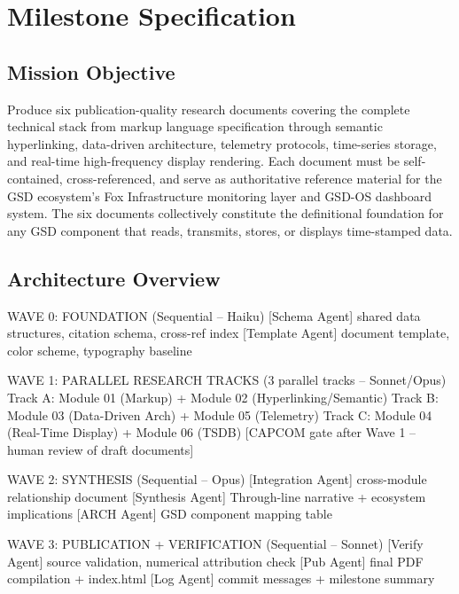 \documentclass[11pt,letterpaper]{article}
\newcommand{\stageheader}[2]{%
  \noindent\colorbox{#2}{\makebox[\textwidth][l]{%
    \textcolor{white}{\bfseries\sffamily\hspace{6pt}#1\hspace{6pt}}}}%
  \vspace{0.5em}\par%
}
\begin{document}
\newpage
\stageheader{STAGE 3 --- MISSION PACKAGE}{tertiary}

\section{Milestone Specification}

\subsection{Mission Objective}

Produce six publication-quality research documents covering the complete technical stack from markup language specification through semantic hyperlinking, data-driven architecture, telemetry protocols, time-series storage, and real-time high-frequency display rendering. Each document must be self-contained, cross-referenced, and serve as authoritative reference material for the GSD ecosystem's Fox Infrastructure monitoring layer and GSD-OS dashboard system. The six documents collectively constitute the definitional foundation for any GSD component that reads, transmits, stores, or displays time-stamped data.

\subsection{Architecture Overview}

\begin{asciibox}
WAVE 0: FOUNDATION (Sequential -- Haiku)
  [Schema Agent]  shared data structures, citation schema, cross-ref index
  [Template Agent] document template, color scheme, typography baseline

WAVE 1: PARALLEL RESEARCH TRACKS (3 parallel tracks -- Sonnet/Opus)
  Track A:  Module 01 (Markup) + Module 02 (Hyperlinking/Semantic)
  Track B:  Module 03 (Data-Driven Arch) + Module 05 (Telemetry)
  Track C:  Module 04 (Real-Time Display) + Module 06 (TSDB)
  [CAPCOM gate after Wave 1 -- human review of draft documents]

WAVE 2: SYNTHESIS (Sequential -- Opus)
  [Integration Agent]  cross-module relationship document
  [Synthesis Agent]    Through-line narrative + ecosystem implications
  [ARCH Agent]         GSD component mapping table

WAVE 3: PUBLICATION + VERIFICATION (Sequential -- Sonnet)
  [Verify Agent]   source validation, numerical attribution check
  [Pub Agent]      final PDF compilation + index.html
  [Log Agent]      commit messages + milestone summary
\end{asciibox}
\end{document}
